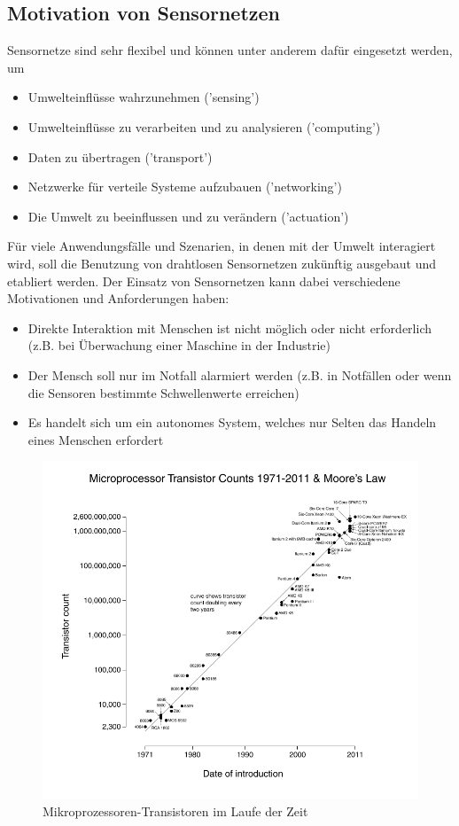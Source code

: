 \subsection{Motivation von Sensornetzen}\label{ss:MotivationSensornetze}

Sensornetze sind sehr flexibel und können unter anderem dafür eingesetzt werden, um
\begin{itemize}
	\item Umwelteinflüsse wahrzunehmen ('sensing')
	\item Umwelteinflüsse zu verarbeiten und zu analysieren ('computing')
	\item Daten zu übertragen ('transport')
	\item Netzwerke für verteile Systeme aufzubauen ('networking')
	\item Die Umwelt zu beeinflussen und zu verändern ('actuation')
\end{itemize}

F\"ur viele Anwendungsfälle und Szenarien, in denen mit der Umwelt interagiert wird, soll die Benutzung von drahtlosen Sensornetzen zukünftig ausgebaut und etabliert werden. Der Einsatz von Sensornetzen kann dabei verschiedene Motivationen und Anforderungen haben:
\begin{itemize}
	\item Direkte Interaktion mit Menschen ist nicht möglich oder nicht erforderlich (z.B. bei Überwachung einer Maschine in der Industrie)
	\item Der Mensch soll nur im Notfall alarmiert werden (z.B. in Notfällen oder wenn die Sensoren bestimmte Schwellenwerte erreichen)
	\item Es handelt sich um ein autonomes System, welches nur Selten das Handeln eines Menschen erfordert
\end{itemize}

\begin{figure}[H] 
	\centering
	\includegraphics[scale=0.5]{Bilder/mooreslaw}
	\caption{Mikroprozessoren-Transistoren im Laufe der Zeit\cite{i:mooreslaw}}
	\label{f:mooreslaw}
\end{figure}

